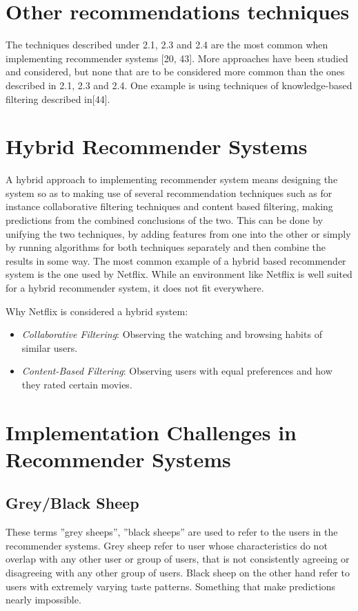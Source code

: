 \section{Other recommendations techniques}
The techniques described under 2.1, 2.3 and 2.4 are the most common when implementing recommender systems [20, 43]. More approaches have been studied and considered, but none that are to be considered more common than the ones described in 2.1, 2.3 and 2.4. One example is using techniques of knowledge-based filtering described in[44].

\section{Hybrid Recommender Systems}
A hybrid approach to implementing recommender system means designing the system so as to making use of several recommendation techniques such as for instance collaborative filtering techniques and content based filtering, making predictions from the combined conclusions of the two. This can be done by unifying the two techniques, by adding features from one into the other or simply by running algorithms for both techniques separately and then combine the results in some way. The most common example of a hybrid based recommender system is the one used by Netflix. While an environment like Netflix is well suited for a hybrid recommender system, it does not fit everywhere.

Why Netflix is considered a hybrid system:

\begin{itemize}
	\item {\textit{Collaborative Filtering}: Observing the watching and browsing habits of similar users.}
	\item {\textit{Content-Based Filtering}: Observing users with equal preferences and how they rated certain movies.}

\end{itemize}

\section{Implementation Challenges in Recommender Systems}

\subsection{Grey/Black Sheep}
These terms ”grey sheeps”, ”black sheeps” are used to refer to the users in the recommender systems. Grey sheep refer to user whose characteristics do not overlap with any other user or group of users, that is not consistently agreeing or disagreeing with any other group of users. Black sheep on the other hand refer to users with extremely varying taste patterns. Something that make predictions nearly impossible.

